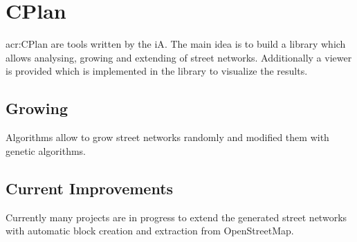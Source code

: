 \section{CPlan}
\label{CPlan}
\gls{acr:CPlan} are tools written by the \acrlong{iA}. The main idea is to build a library which allows analysing, growing and extending of street networks. Additionally a viewer is provided which is implemented in the library to visualize the results. \citep{cPlan:2015}

\subsection{Growing}
Algorithms allow to grow street networks randomly and modified them with genetic algorithms.

\subsection{Current Improvements}
Currently many projects are in progress to extend the generated street networks with automatic block creation and extraction from OpenStreetMap.

